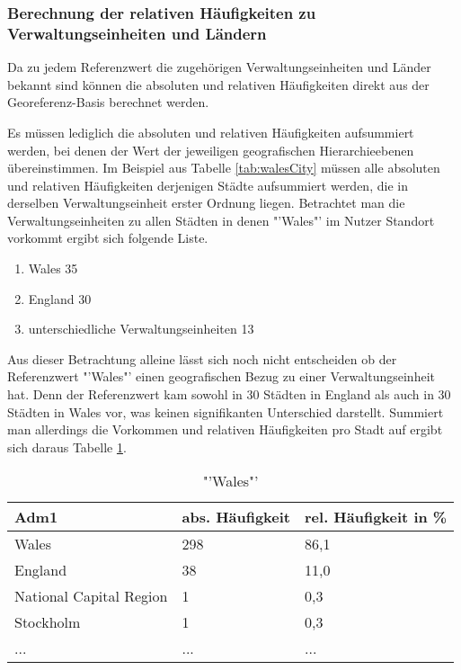 		\subsubsection{Berechnung der relativen Häufigkeiten zu Verwaltungseinheiten und Ländern} 

			Da zu jedem Referenzwert die zugehörigen Verwaltungseinheiten und Länder bekannt sind können die absoluten und relativen Häufigkeiten direkt aus der Georeferenz-Basis berechnet werden.

			Es müssen lediglich die absoluten und relativen Häufigkeiten aufsummiert werden, bei denen der Wert der jeweiligen geografischen Hierarchieebenen übereinstimmen.
			Im Beispiel aus Tabelle \ref{tab:walesCity} müssen alle absoluten und relativen Häufigkeiten derjenigen Städte aufsummiert werden, die in derselben Verwaltungseinheit erster Ordnung liegen.
			Betrachtet man die Verwaltungseinheiten zu allen Städten in denen "'Wales"' im Nutzer Standort vorkommt ergibt sich folgende Liste.

			\begin{enumerate}
				\item Wales 35
				\item England 30
				\item unterschiedliche Verwaltungseinheiten 13
			\end{enumerate}

			Aus dieser Betrachtung alleine lässt sich noch nicht entscheiden ob der Referenzwert "'Wales"' einen geografischen Bezug zu einer Verwaltungseinheit hat.
			Denn der Referenzwert kam sowohl in 30 Städten in England als auch in 30 Städten in Wales vor, was keinen signifikanten Unterschied darstellt. 
			Summiert man allerdings die Vorkommen und relativen Häufigkeiten pro Stadt auf ergibt sich daraus Tabelle \ref{tab:WalesVerw1}.

			\begin{table}[h]
			\centering
			\caption{"'Wales"'}
			\label{tab:WalesVerw1}
			\begin{tabular}{|l|l|l|}
			\hline
			Adm1 & abs. Häufigkeit & rel. Häufigkeit in \% \\ \hline \hline
			Wales                   & 298 & 86,1 \\ \hline
			England                 & 38  & 11,0 \\ \hline
			National Capital Region & 1   & 0,3  \\ \hline
			Stockholm               & 1   & 0,3  \\ \hline
			... & ... & ... \\ \hline
			\end{tabular}
			\end{table}  

